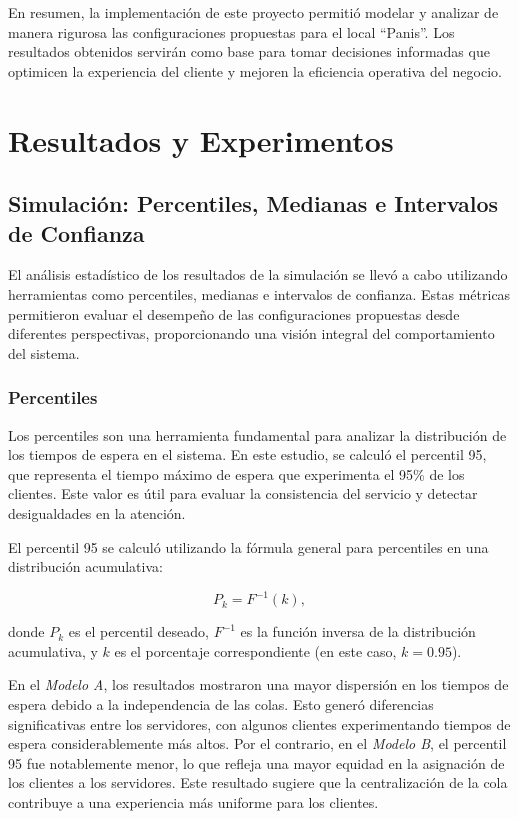 \documentclass[a4paper,12pt]{article}
\begin{document}
En resumen, la implementación de este proyecto permitió modelar y analizar de manera rigurosa las configuraciones propuestas para el local “Panis”. Los resultados obtenidos servirán como base para tomar decisiones informadas que optimicen la experiencia del cliente y mejoren la eficiencia operativa del negocio.

\section{Resultados y Experimentos}

\subsection{Simulación: Percentiles, Medianas e Intervalos de Confianza}

El análisis estadístico de los resultados de la simulación se llevó a cabo utilizando herramientas como percentiles, medianas e intervalos de confianza. Estas métricas permitieron evaluar el desempeño de las configuraciones propuestas desde diferentes perspectivas, proporcionando una visión integral del comportamiento del sistema.

\subsubsection{Percentiles}

Los percentiles son una herramienta fundamental para analizar la distribución de los tiempos de espera en el sistema. En este estudio, se calculó el percentil 95, que representa el tiempo máximo de espera que experimenta el 95\% de los clientes. Este valor es útil para evaluar la consistencia del servicio y detectar desigualdades en la atención.

El percentil 95 se calculó utilizando la fórmula general para percentiles en una distribución acumulativa:

\[
P_k = F^{-1}(k),
\]

donde \( P_k \) es el percentil deseado, \( F^{-1} \) es la función inversa de la distribución acumulativa, y \( k \) es el porcentaje correspondiente (en este caso, \( k = 0.95 \)).

En el \textit{Modelo A}, los resultados mostraron una mayor dispersión en los tiempos de espera debido a la independencia de las colas. Esto generó diferencias significativas entre los servidores, con algunos clientes experimentando tiempos de espera considerablemente más altos. Por el contrario, en el \textit{Modelo B}, el percentil 95 fue notablemente menor, lo que refleja una mayor equidad en la asignación de los clientes a los servidores. Este resultado sugiere que la centralización de la cola contribuye a una experiencia más uniforme para los clientes.
\end{document}
